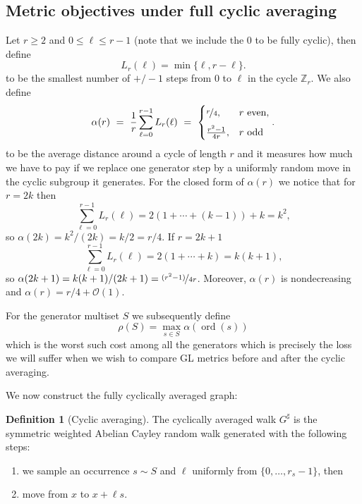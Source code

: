 \documentclass[11pt]{article}
\theoremstyle{definition}
\newtheorem{definition}[theorem]{Definition}
\theoremstyle{remark}
\newcommand{\Z}{\mathbb{Z}}
\newcommand{\ord}{\operatorname{ord}}
\begin{document}
\subsection{Metric objectives under full cyclic averaging}
Let $r\geq 2$ and $0 \leq \ell \leq r-1$ (note that we include the 0 to be fully cyclic), then define
\begin{equation}\label{eq:Lr-def}
  L_r(\ell)=\min\{\ell,r-\ell\}.
\end{equation}
to be the smallest number of $+/-1$ steps from $0$ to $\ell$ in the cycle $\Z_r$. We also define
\begin{equation}\label{eq:alpha-def}
  \alpha(r)~=~\frac1{r}\sum_{\ell=0}^{r-1}L_r(\ell) 
  ~=~ \begin{cases}
    \nicefrac{r}{4},&r\text{ even},\\[6pt]
    \frac{r^2-1}{4r},&r\text{ odd}
  \end{cases}.
\end{equation}
to be the average distance around a cycle of length $r$ and it measures how much we have to pay if we replace one generator step by a uniformly random move in the cyclic subgroup it generates. For the closed form of $\alpha(r)$ we notice that for $r=2k$ then 
\[
  \sum_{\ell=0}^{r-1}L_r(\ell)
  =2(1+\cdots+(k-1))+k=k^2,
\]
so $\alpha(2k)=k^2/(2k)=k/2=r/4$.
If $r=2k+1$
\[
  \sum_{\ell=0}^{r-1}L_r(\ell)
  =2(1 + \cdots + k)=k(k+1),
\]
so $\alpha(2k+1)=k(k+1)/(2k+1)=\nicefrac{(r^2-1)}{4r}$. 
Moreover, $\alpha(r)$ is nondecreasing and $\alpha(r)=r/4+\mathcal{O}(1)$. 

For the generator multiset $S$ we subsequently define
\begin{equation}\label{eq:rho-def}
  \rho(S)=\max_{s\in S}\alpha(\ord(s))
\end{equation}
which is the worst such cost among all the generators which is precisely the loss we will suffer when we wish to compare GL metrics before and after the cyclic averaging.

We now construct the fully cyclically averaged  graph:
\begin{definition}[Cyclic averaging]\label{def:cyclic-averaging}
The cyclically averaged walk $G^\sharp$ is the symmetric weighted Abelian Cayley random walk generated with the following steps:
\begin{enumerate}
  \item we sample an occurrence $s\sim S$ and $\ell$ uniformly from $\{0,\ldots,r_s-1\}$, then
  \item move from $x$ to $x+\ell s$.
\end{enumerate}
\end{definition}
\end{document}
